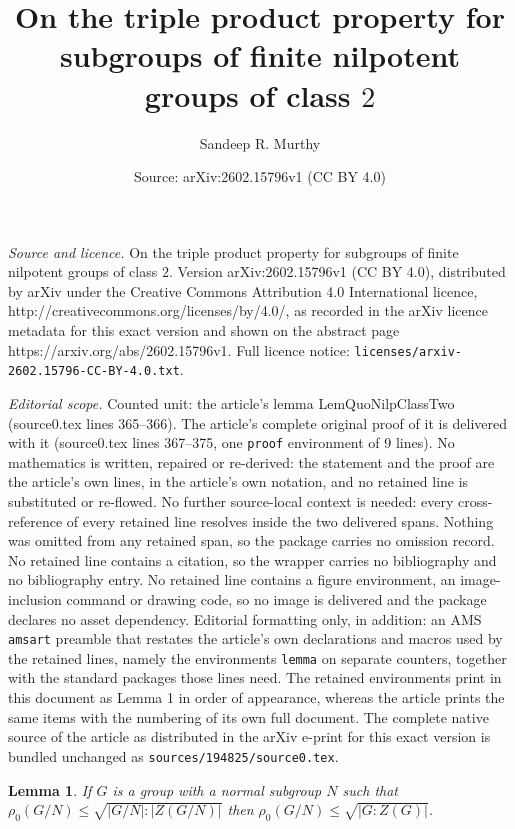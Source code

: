 \documentclass[10pt,a4paper]{amsart}
\title{On the triple product property for subgroups of finite nilpotent groups of class $2$}
\author{Sandeep R. Murthy}
\date{Source: arXiv:2602.15796v1 (CC BY 4.0)}
\newtheorem{lemma}{Lemma}
\begin{document}
\maketitle

\noindent\emph{Source and licence.} On the triple product property for subgroups of finite nilpotent groups of class $2$. Version arXiv:2602.15796v1 (CC BY 4.0), distributed by arXiv under the Creative Commons Attribution 4.0 International licence, http://creativecommons.org/licenses/by/4.0/, as recorded in the arXiv licence metadata for this exact version and shown on the abstract page https://arxiv.org/abs/2602.15796v1. Full licence notice: \texttt{licenses/arxiv-2602.15796-CC-BY-4.0.txt}.\par\smallskip

\noindent\textit{Editorial scope.} Counted unit: the article's lemma LemQuoNilpClassTwo (source0.tex lines 365--366). The article's complete original proof of it is delivered with it (source0.tex lines 367--375, one \texttt{proof} environment of 9 lines). No mathematics is written, repaired or re-derived: the statement and the proof are the article's own lines, in the article's own notation, and no retained line is substituted or re-flowed.  No further source-local context is needed: every cross-reference of every retained line resolves inside the two delivered spans.  Nothing was omitted from any retained span, so the package carries no omission record.  No retained line contains a citation, so the wrapper carries no bibliography and no bibliography entry.  No retained line contains a figure environment, an image-inclusion command or drawing code, so no image is delivered and the package declares no asset dependency.  Editorial formatting only, in addition: an AMS \texttt{amsart} preamble that restates the article's own declarations and macros used by the retained lines, namely the environments \texttt{lemma} on separate counters, together with the standard packages those lines need.  The retained environments print in this document as Lemma 1 in order of appearance, whereas the article prints the same items with the numbering of its own full document.  The complete native source of the article as distributed in the arXiv e-print for this exact version is bundled unchanged as \texttt{sources/194825/source0.tex}.
\begin{lemma}\label{LemQuoNilpClassTwo} If $G$ is a group with a normal subgroup $N$ such that $\rho_0(G/N) \leq \sqrt{|G/N|:|Z(G/N)|}$ then $\rho_0(G/N) \leq \sqrt{|G:Z(G)|}$.
\end{lemma}
\end{document}
